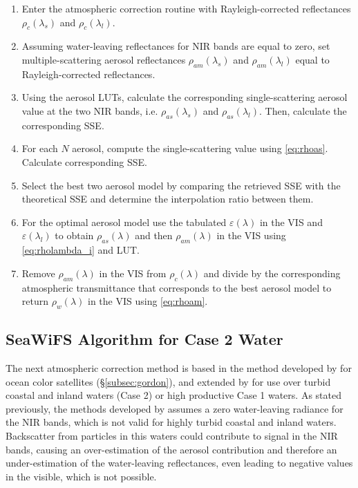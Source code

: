 \begin{enumerate}[itemsep=2pt,parsep=2pt]
  \item Enter the atmospheric correction routine with Rayleigh-corrected reflectances $\rho_c(\lambda_s)$ and $\rho_c(\lambda_l)$.
  \item Assuming water-leaving reflectances for NIR bands are equal to zero, set multiple-scattering aerosol reflectances $\rho_{am}(\lambda_s)$ and $\rho_{am}(\lambda_l)$ equal to Rayleigh-corrected reflectances.
  \item Using the aerosol LUTs, calculate the corresponding single-scattering aerosol value at the two NIR bands, i.e. $\rho_{as}(\lambda_s)$ and $\rho_{as}(\lambda_l)$. Then, calculate the corresponding SSE.
  \item For each $N$ aerosol, compute the single-scattering value using \autoref{eq:rhoas}. Calculate corresponding SSE.
  \item Select the best two aerosol model by comparing the retrieved SSE with the theoretical SSE and determine the interpolation ratio between them.
  \item For the optimal aerosol model use the tabulated $\varepsilon(\lambda)$ in the VIS and $\varepsilon(\lambda_l)$ to obtain $\rho_{as}(\lambda)$ and then $\rho_{am}(\lambda)$ in the VIS using \autoref{eq:rholambda_i} and LUT.
  \item Remove $\rho_{am}(\lambda)$ in the VIS from $\rho_c(\lambda)$ and divide by the corresponding atmospheric transmittance that corresponds to the best aerosol model to return $\rho_w(\lambda)$ in the VIS using \autoref{eq:rhoam}.
\end{enumerate}

\subsection{SeaWiFS Algorithm for Case 2 Water}
\label{subsec:ruddick}

The next atmospheric correction method is based in the method developed by \cite{Gordon:1994} for ocean color satellites (\S\ref{subsec:gordon}), and extended by \cite{Ruddick:2000bs} for use over turbid coastal and inland waters (Case 2) or high productive Case 1 waters. As stated previously, the methods developed by \cite{Gordon:1994} assumes a zero water-leaving radiance for the NIR bands, which is not valid for highly turbid coastal and inland waters. Backscatter from particles in this waters could contribute to signal in the NIR bands, causing an over-estimation of the aerosol contribution and therefore an under-estimation of the water-leaving reflectances, even leading to negative values in the visible, which is not possible. 

